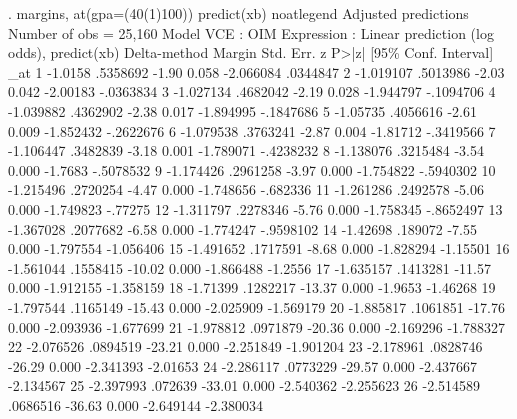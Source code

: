 . margins, at(gpa=(40(1)100)) predict(xb) noatlegend
{\smallskip}
Adjusted predictions                            Number of obs     =     25,160
Model VCE    : OIM
{\smallskip}
Expression   : Linear prediction (log odds), predict(xb)
{\smallskip}
             {\VBAR}            Delta-method
             {\VBAR}     Margin   Std. Err.      z    P>|z|     [95\% Conf. Interval]
         _at {\VBAR}
          1  {\VBAR}    -1.0158   .5358692    -1.90   0.058    -2.066084    .0344847
          2  {\VBAR}  -1.019107   .5013986    -2.03   0.042     -2.00183   -.0363834
          3  {\VBAR}  -1.027134   .4682042    -2.19   0.028    -1.944797   -.1094706
          4  {\VBAR}  -1.039882   .4362902    -2.38   0.017    -1.894995   -.1847686
          5  {\VBAR}   -1.05735   .4056616    -2.61   0.009    -1.852432   -.2622676
          6  {\VBAR}  -1.079538   .3763241    -2.87   0.004     -1.81712   -.3419566
          7  {\VBAR}  -1.106447   .3482839    -3.18   0.001    -1.789071   -.4238232
          8  {\VBAR}  -1.138076   .3215484    -3.54   0.000      -1.7683   -.5078532
          9  {\VBAR}  -1.174426   .2961258    -3.97   0.000    -1.754822   -.5940302
         10  {\VBAR}  -1.215496   .2720254    -4.47   0.000    -1.748656    -.682336
         11  {\VBAR}  -1.261286   .2492578    -5.06   0.000    -1.749823     -.77275
         12  {\VBAR}  -1.311797   .2278346    -5.76   0.000    -1.758345   -.8652497
         13  {\VBAR}  -1.367028   .2077682    -6.58   0.000    -1.774247   -.9598102
         14  {\VBAR}   -1.42698    .189072    -7.55   0.000    -1.797554   -1.056406
         15  {\VBAR}  -1.491652   .1717591    -8.68   0.000    -1.828294    -1.15501
         16  {\VBAR}  -1.561044   .1558415   -10.02   0.000    -1.866488     -1.2556
         17  {\VBAR}  -1.635157   .1413281   -11.57   0.000    -1.912155   -1.358159
         18  {\VBAR}   -1.71399   .1282217   -13.37   0.000      -1.9653    -1.46268
         19  {\VBAR}  -1.797544   .1165149   -15.43   0.000    -2.025909   -1.569179
         20  {\VBAR}  -1.885817   .1061851   -17.76   0.000    -2.093936   -1.677699
         21  {\VBAR}  -1.978812   .0971879   -20.36   0.000    -2.169296   -1.788327
         22  {\VBAR}  -2.076526   .0894519   -23.21   0.000    -2.251849   -1.901204
         23  {\VBAR}  -2.178961   .0828746   -26.29   0.000    -2.341393    -2.01653
         24  {\VBAR}  -2.286117   .0773229   -29.57   0.000    -2.437667   -2.134567
         25  {\VBAR}  -2.397993    .072639   -33.01   0.000    -2.540362   -2.255623
         26  {\VBAR}  -2.514589   .0686516   -36.63   0.000    -2.649144   -2.380034

